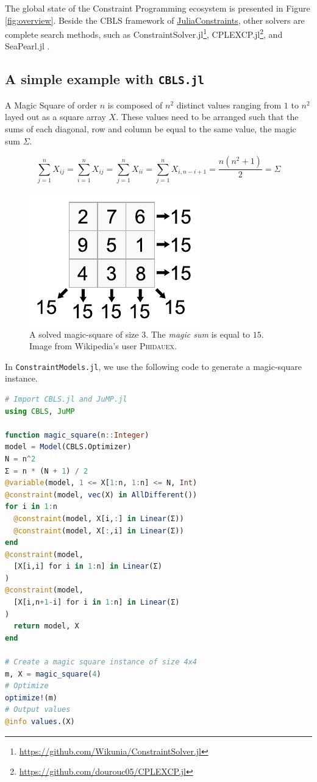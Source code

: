\documentclass{juliacon}
\newcommand{\jc}{\href{https://github.com/JuliaConstraints}{JuliaConstraints}\xspace}
\begin{document}
The global state of the Constraint Programming ecosystem is presented in Figure \ref{fig:overview}. Beside the CBLS framework of \jc, other solvers are complete search methods, such as ConstraintSolver.jl\footnote{\url{https://github.com/Wikunia/ConstraintSolver.jl}}, CPLEXCP.jl\footnote{\url{https://github.com/dourouc05/CPLEXCP.jl}}, and SeaPearl.jl \cite{chalumeau2021seapearl}.

\subsection{A simple example with \texttt{CBLS.jl}}
\label{subsec:example}

A Magic Square of order $n$ is composed of $n^2$ distinct values ranging from $1$ to $n^2$ layed out as a square array $X$.  These values need to be arranged such that the sums of each diagonal, row and column be equal to the same value, the magic sum $\Sigma$.

\[ \sum_{j=1}^{n} X_{ij} = \sum_{i=1}^{n} X_{ij} = \sum_{j=1}^{n} X_{ii} = \sum_{j=1}^{n} X_{i,n-i+1} = \frac{n(n^{2}+1)}{2} = \Sigma \]

\begin{figure}[t]
  \centerline{\includegraphics[page=1]{figs/magicsquare.pdf}}
  \caption{A solved magic-square of size $3$. The \emph{magic sum} is equal to $15$. Image from Wikipedia's user \textsc{Phidauex}.}
  \label{fig:magicsquare}
\end{figure}

In \texttt{ConstraintModels.jl}, we use the following code to generate a magic-square instance.

\begin{lstlisting}[language = Julia]
# Import CBLS.jl and JuMP.jl
using CBLS, JuMP

function magic_square(n::Integer)
model = Model(CBLS.Optimizer)
N = n^2
Σ = n * (N + 1) / 2
@variable(model, 1 <= X[1:n, 1:n] <= N, Int)
@constraint(model, vec(X) in AllDifferent())
for i in 1:n
  @constraint(model, X[i,:] in Linear(Σ))
  @constraint(model, X[:,i] in Linear(Σ))
end
@constraint(model,
  [X[i,i] for i in 1:n] in Linear(Σ)
)
@constraint(model,
  [X[i,n+1-i] for i in 1:n] in Linear(Σ)
)
  return model, X
end

# Create a magic square instance of size 4x4
m, X = magic_square(4)
# Optimize
optimize!(m)
# Output values
@info values.(X)
\end{lstlisting}
\end{document}

